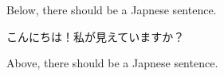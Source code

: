 \documentclass[uplatex]{jsarticle}
\begin{document}
Below, there should be a Japnese sentence.

こんにちは！私が見えていますか？

Above, there should be a Japnese sentence.
\end{document}
